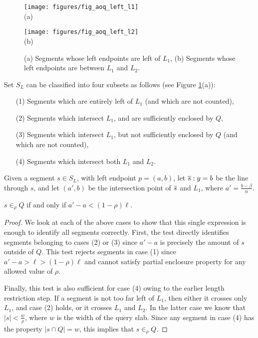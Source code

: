 \begin{figure}[h]
\begin{minipage}[b]{0.5\linewidth}
\centering
\texttt{[image: figures/fig\_aoq\_left\_l1]}\\
(a)
\end{minipage}
\begin{minipage}[b]{0.5\linewidth}
\centering
\texttt{[image: figures/fig\_aoq\_left\_l2]}\\
(b)
\end{minipage}
\caption{(a) Segments whose left endpoints are left of $L_1$, (b) Segments whose 
left endpoints are between $L_1$ and $L_2$.}
\label{fig:slabs:one:aoq_left_l1_l1l2}
\end{figure}

Set $S_L$ can be classified into four subsets as follows (see Figure 
\ref{fig:slabs:one:aoq_left_l1_l1l2}(a)):

\begin{itemize}
 \item[(1)] Segments which are entirely left of $L_1$ (and which are not counted),
 \item[(2)] Segments which intersect $L_1$, and are sufficiently enclosed by $Q$,
 \item[(3)] Segments which intersect $L_1$, but not sufficiently enclosed by 
 $Q$ (and which are not counted),
 \item[(4)] Segments which intersect both $L_1$ and $L_2$. 
\end{itemize}

Given a segment $s \in S_L$, with left endpoint $p = (a,b)$, let $\overline{s}: y = b$ 
be the line through $s$, and let $(a', b)$ be the intersection point of $\overline{s}$ 
and $L_1$, where $a' = \frac{b - \beta}{\alpha}$. 

\begin{observation}\label{o21}
 $s \in_\rho Q$ if and only if $a' - a < (1 - \rho)\ell$.
\end{observation}
\begin{proof}
We look at each of the above cases to show that this single expression is 
enough 
to identify all segments correctly. 
First, the test directly identifies segments belonging to cases (2) or (3) 
since 
$a' - a$ is precisely the amount of $s$ outside of $Q$. 
This test rejects segments in case (1) since $a' - a > \ell
> (1-\rho)\ell$ and cannot satisfy partial enclosure property for any allowed 
value of $\rho$. 

Finally, this test is also sufficient for case (4) owing to the earlier length 
restriction step. If a segment is not too far left 
of $L_1$, then either it crosses only $L_1$, and case (2) holds, or it 
crosses $L_1$ and $L_2$. In the latter case we know that $|s| < 
\frac{w}{\rho}$, where $w$ is the width of the query slab. Since any 
segment in case (4) has the property $|s \cap Q| = w$, this implies that 
$s \in_\rho Q$.
\end{proof}

